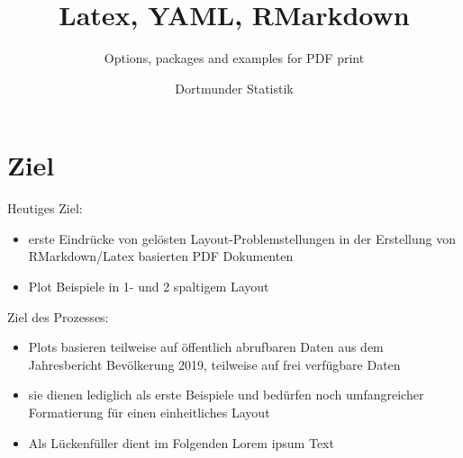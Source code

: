 \documentclass[
  a4paper,
  twoside]{article}
\title{Latex, YAML, RMarkdown}
\subtitle{Options, packages and examples for PDF print}
\author{Dortmunder Statistik}
\date{}
\providecommand{\tightlist}{%
  \setlength{\itemsep}{0pt}\setlength{\parskip}{0pt}}
\begin{document}
\maketitle

\renewcommand*\contentsname{Inhaltsverzeichnis}
{
\hypersetup{linkcolor=}
\setcounter{tocdepth}{4}
\tableofcontents
}
\newpage

\hypertarget{ziel}{%
\section{Ziel}\label{ziel}}

\textcolor{DoStat}{Heutiges Ziel:}

\begin{itemize}
\tightlist
\item
  erste Eindrücke von gelösten Layout-Problemstellungen in der Erstellung von RMarkdown/Latex basierten PDF Dokumenten
\item
  Plot Beispiele in 1- und 2 spaltigem Layout
\end{itemize}

\textcolor{DoStat}{Ziel des Prozesses:}

\begin{itemize}
\tightlist
\item
  Plots basieren teilweise auf öffentlich abrufbaren Daten aus dem Jahresbericht Bevölkerung 2019, teilweise auf frei verfügbare Daten
\item
  sie dienen lediglich als \textcolor{DoStat}{erste Beispiele} und bedürfen noch umfangreicher Formatierung für einen einheitliches Layout
\item
  Als Lückenfüller dient im Folgenden Lorem ipsum Text
\end{itemize}

\newpage
\end{document}

